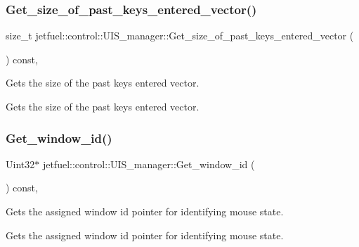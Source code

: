 \subsubsection{\texorpdfstring{Get\+\_\+size\+\_\+of\+\_\+past\+\_\+keys\+\_\+entered\+\_\+vector()}{Get\_size\_of\_past\_keys\_entered\_vector()}}
{\footnotesize\ttfamily size\+\_\+t jetfuel\+::control\+::\+U\+I\+S\+\_\+manager\+::\+Get\+\_\+size\+\_\+of\+\_\+past\+\_\+keys\+\_\+entered\+\_\+vector (\begin{DoxyParamCaption}{ }\end{DoxyParamCaption}) const\hspace{0.3cm}{\ttfamily [inline]}, {\ttfamily [protected]}}



Gets the size of the past keys entered vector. 

Gets the size of the past keys entered vector. \mbox{\label{classjetfuel_1_1control_1_1UIS__manager_a31b973b02f3a17afed1de151db5704ed}} 
\subsubsection{\texorpdfstring{Get\+\_\+window\+\_\+id()}{Get\_window\_id()}}
{\footnotesize\ttfamily Uint32$\ast$ jetfuel\+::control\+::\+U\+I\+S\+\_\+manager\+::\+Get\+\_\+window\+\_\+id (\begin{DoxyParamCaption}{ }\end{DoxyParamCaption}) const\hspace{0.3cm}{\ttfamily [inline]}, {\ttfamily [protected]}}



Gets the assigned window id pointer for identifying mouse state. 

Gets the assigned window id pointer for identifying mouse state. \mbox{\label{classjetfuel_1_1control_1_1UIS__manager_a993f8dbe8b39656a426bbd7aa5568c14}} 
